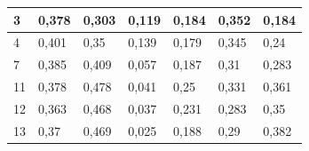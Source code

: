 \documentclass{classrep}
\begin{document}
{\begin{table}[h]
\begin{center}
\begin{tabular}{|l|l|l|l|l|l|l|}
3                                                        & 0,378                                                & 0,303                                                   & 0,119                                                    & 0,184                                                       & 0,352                                                   & 0,184                                                      \\ \hline
4                                                        & 0,401                                                & 0,35                                                    & 0,139                                                    & 0,179                                                       & 0,345                                                   & 0,24                                                       \\ \hline
7                                                        & 0,385                                                & 0,409                                                   & 0,057                                                    & 0,187                                                       & 0,31                                                    & 0,283                                                      \\ \hline
11                                                       & 0,378                                                & 0,478                                                   & 0,041                                                    & 0,25                                                        & 0,331                                                   & 0,361                                                      \\ \hline
12                                                       & 0,363                                                & 0,468                                                   & 0,037                                                    & 0,231                                                       & 0,283                                                   & 0,35                                                       \\ \hline
13                                                       & 0,37                                                 & 0,469                                                   & 0,025                                                    & 0,188                                                       & 0,29                                                    & 0,382                                                      \\ \hline

\end{tabular}
\end{center}
\end{table}}
\end{document}
